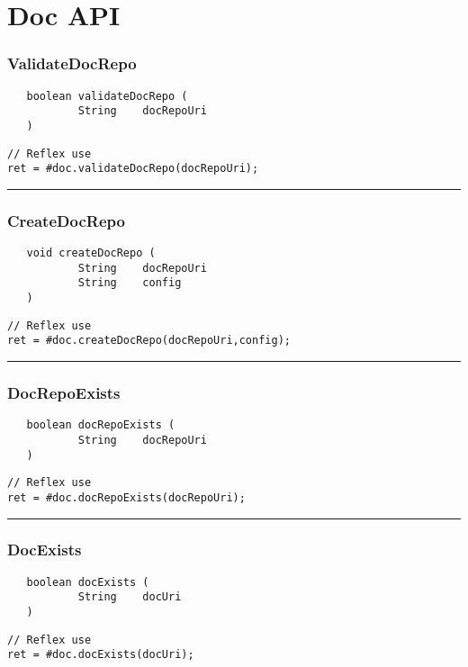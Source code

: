 \section{Doc API}

\subsubsection{ValidateDocRepo}
\label{Api:ValidateDocRepo}
\begin{verbatim}
   boolean validateDocRepo (
           String    docRepoUri
   )
\end{verbatim}
\begin{lstlisting}[language=reflex]
// Reflex use
ret = #doc.validateDocRepo(docRepoUri);
\end{lstlisting}



\rule{15cm}{2pt}
\subsubsection{CreateDocRepo}
\label{Api:CreateDocRepo}
\begin{verbatim}
   void createDocRepo (
           String    docRepoUri
           String    config
   )
\end{verbatim}
\begin{lstlisting}[language=reflex]
// Reflex use
ret = #doc.createDocRepo(docRepoUri,config);
\end{lstlisting}



\rule{15cm}{2pt}
\subsubsection{DocRepoExists}
\label{Api:DocRepoExists}
\begin{verbatim}
   boolean docRepoExists (
           String    docRepoUri
   )
\end{verbatim}
\begin{lstlisting}[language=reflex]
// Reflex use
ret = #doc.docRepoExists(docRepoUri);
\end{lstlisting}



\rule{15cm}{2pt}
\subsubsection{DocExists}
\label{Api:DocExists}
\begin{verbatim}
   boolean docExists (
           String    docUri
   )
\end{verbatim}
\begin{lstlisting}[language=reflex]
// Reflex use
ret = #doc.docExists(docUri);
\end{lstlisting}



